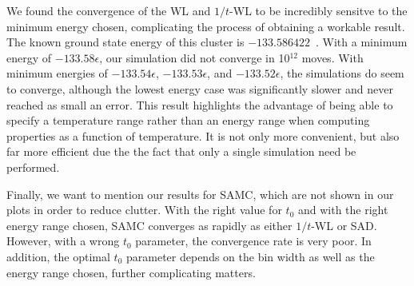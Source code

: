 \documentclass[letterpaper,twocolumn,amsmath,amssymb,pre,aps,10pt]{revtex4-1}
\begin{document}

We found the convergence of the WL and $1/t$-WL to be incredibly
sensitve to the minimum energy chosen, complicating the process of
obtaining a workable result.  The known ground state energy of this
cluster is $-133.586422$~\cite{northby1987structure, wales1997global}.  With a minimum energy of
$-133.58\epsilon$, our simulation did not converge in 10$^{12}$ moves.
With minimum energies of $-133.54\epsilon$, $-133.53\epsilon$, and
$-133.52\epsilon$, the simulations do seem to converge, although the
lowest energy case was significantly slower and never reached as small
an error.  This result highlights the advantage of being able to
specify a temperature range rather than an energy range when computing
properties as a function of temperature.  It is not only more
convenient, but also far more efficient due the the fact that only a
single simulation need be performed.


Finally, we want to mention our results for SAMC, which are not shown
in our plots in order to reduce clutter.  With the right value for
$t_0$ and with the right energy range chosen, SAMC converges as
rapidly as either $1/t$-WL or SAD.  However, with a wrong $t_0$
parameter, the convergence rate is very poor.  In addition, the
optimal $t_0$ parameter depends on the bin width as well as the energy
range chosen, further complicating matters.
\end{document}
